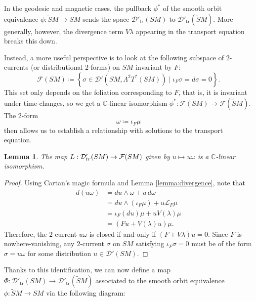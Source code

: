 \documentclass[reqno,12pt,letterpaper]{amsart}
\newtheorem{lemma}[proposition]{Lemma}
\theoremstyle{definition}
\theoremstyle{remark}
\theoremstyle{definition}
\numberwithin{equation}{section}
\begin{document}
In the geodesic and magnetic cases, the pullback $\phi^*$ of the smooth orbit equivalence $\phi: \widetilde{S}M\to SM$ sends the space $\mathcal{D}'_{\text{tr}}(SM)$ to $\mathcal{D}'_{\text{tr}}(\widetilde{S}M)$. More generally, however, the divergence term $V\lambda$ appearing in the transport equation breaks this down. 

Instead, a more useful perspective is to look at the following subspace of $2$-currents (or distributional $2$-forms) on $SM$ invariant by $F$: 
\begin{equation*}\label{eq:2-currents}
\mathcal{F}(SM)\coloneqq \left\{\sigma \in \mathcal{D}'(SM, \Lambda^2 T^*(SM))\mid \iota_F \sigma = d\sigma = 0\right\}.
\end{equation*}
This set only depends on the foliation corresponding to $F$, that is, it is invariant under time-changes, so we get a $\mathbb{C}$-linear isomorphism $\phi^*: \mathcal{F}(SM)\to \mathcal{F}(\widetilde{S}M)$. The 2-form
\begin{equation}\label{eq:definition-special-form}
\omega\coloneqq\iota_F \mu
\end{equation}
then allows us to establish a relationship with solutions to the transport equation. 
\begin{lemma}\label{lemma:current-isomorphism}
The map $L:\mathcal{D}'_{\textup{tr}}(SM)\to \mathcal{F}(SM)$ given by $u\mapsto u \omega$ is a $\mathbb{C}$-linear isomorphism.
\end{lemma}
\begin{proof}
Using Cartan's magic formula and Lemma \ref{lemma:divergence}, note that
\begin{equation*}
\begin{alignedat}{1}
d(u\omega)&= du\wedge \omega + u\, d\omega\\
&=du\wedge(\iota_F\mu)+ u \mathcal{L}_F\mu\\
&=\iota_F(du)\mu +uV(\lambda)\mu\\
&=(Fu+V(\lambda)u)\mu.
\end{alignedat}
\end{equation*}
Therefore, the $2$-current $u\omega$ is closed if and only if $(F+V\lambda)u=0$. Since $F$ is nowhere-vanishing, any $2$-current $\sigma$ on $SM$ satisfying $\iota_F \sigma = 0$ must be of the form $\sigma=u\omega$ for some distribution $u\in \mathcal{D}'(SM)$.
\end{proof}
Thanks to this identification, we can now define a map $\Phi: \mathcal{D}'_{\text{tr}}(SM)\to\mathcal{D}'_{\text{tr}}(\widetilde{S}M)$ associated to the smooth orbit equivalence $\phi : \widetilde{S}M\to SM$ via the following diagram:
\end{document}
